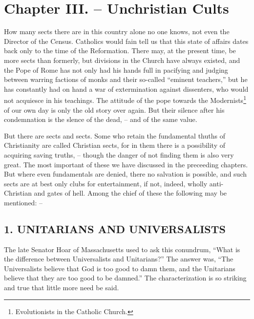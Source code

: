 \documentclass[
]{book}
\begin{document}
\section*{Chapter III. -- Unchristian Cults}\label{chapter-iii.-unchristian-cults}

How many sects there are in this country alone no one knows, not even the Director of the Census. Catholics would fain tell us that this state of affairs dates back only to the time of the Reformation. There may, at the present time, be more sects than formerly, but divisions in the Church have always existed, and the Pope of Rome has not only had his hands full in pacifying and judging between warring factions of monks and their so-called ``eminent teachers,'' but he has constantly had on hand a war of extermination against dissenters, who would not acquiesce in his teachings. The attitude of the pope towards the Modernists\footnote{Evolutionists in the Catholic Church.} of our own day is only the old story over again. But their silence after his condemnation is the slence of the dead, -- and of the same value.

But there are sects and sects. Some who retain the fundamental thuths of Christianity are called Christian sects, for in them there is a possibility of acquiring saving truths, -- though the danger of not finding them is also very great. The most important of these we have discussed in the preceeding chapters. But where even fundamentals are denied, there no salvation is possible, and such sects are at best only clubs for entertainment, if not, indeed, wholly anti-Christian and gates of hell. Among the chief of these the following may be mentioned: --

\subsection*{\texorpdfstring{1. UNITARIANS AND UNIVERSALISTS}{1. UNITARIANS AND UNIVERSALISTS}}\label{unitarians-and-universalists}

The late Senator Hoar of Massachusetts used to ask this conundrum, ``What is the difference between Universalists and Unitarians?'' The answer was, ``The Universalists believe that God is too good to damn them, and the Unitarians believe that they are too good to be damned.'' The characterization is so striking and true that little more need be said.
\end{document}
